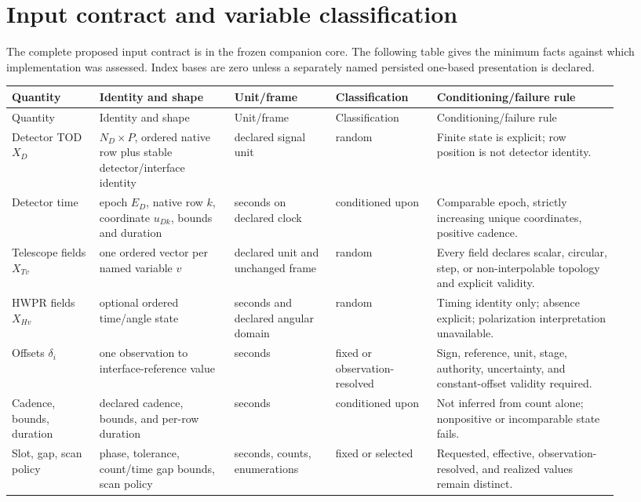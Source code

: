 \documentclass[11pt]{article}
\begin{document}
\section{Input contract and variable classification}

The complete proposed input contract is in the frozen companion core.  The
following table gives the minimum facts against which implementation was
assessed.  Index bases are zero unless a separately named persisted one-based
presentation is declared.

\begin{longtable}{L{0.13\linewidth}L{0.20\linewidth}L{0.15\linewidth}L{0.15\linewidth}L{0.27\linewidth}}
\toprule
Quantity & Identity and shape & Unit/frame & Classification & Conditioning/failure rule\\
\midrule
\endfirsthead
\toprule
Quantity & Identity and shape & Unit/frame & Classification & Conditioning/failure rule\\
\midrule
\endhead
Detector TOD $X_D$ & $N_D\times P$, ordered native row plus stable detector/interface identity & declared signal unit & random & Finite state is explicit; row position is not detector identity.\\
Detector time & epoch $E_D$, native row $k$, coordinate $u_{Dk}$, bounds and duration & seconds on declared clock & conditioned upon & Comparable epoch, strictly increasing unique coordinates, positive cadence.\\
Telescope fields $X_{Tv}$ & one ordered vector per named variable $v$ & declared unit and unchanged frame & random & Every field declares scalar, circular, step, or non-interpolable topology and explicit validity.\\
HWPR fields $X_{Hv}$ & optional ordered time/angle state & seconds and declared angular domain & random & Timing identity only; absence explicit; polarization interpretation unavailable.\\
Offsets $\delta_i$ & one observation to interface-reference value & seconds & fixed or observation-resolved & Sign, reference, unit, stage, authority, uncertainty, and constant-offset validity required.\\
Cadence, bounds, duration & declared cadence, bounds, and per-row duration & seconds & conditioned upon & Not inferred from count alone; nonpositive or incomparable state fails.\\
Slot, gap, scan policy & phase, tolerance, count/time gap bounds, scan policy & seconds, counts, enumerations & fixed or selected & Requested, effective, observation-resolved, and realized values remain distinct.\\

\end{longtable}
\end{document}

